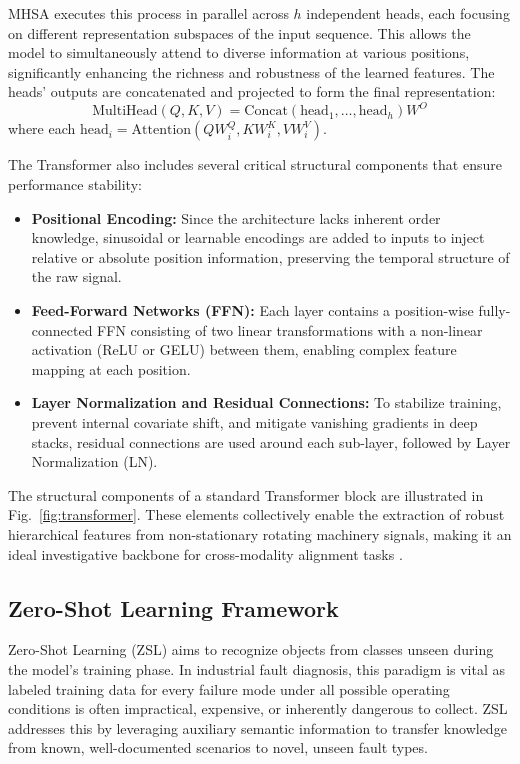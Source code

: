 \documentclass[journal]{IEEEtran}
\begin{document}
MHSA executes this process in parallel across $h$ independent heads, each focusing on different representation subspaces of the input sequence. This allows the model to simultaneously attend to diverse information at various positions, significantly enhancing the richness and robustness of the learned features. The heads' outputs are concatenated and projected to form the final representation:
\begin{equation}
\text{MultiHead}(Q, K, V) = \text{Concat}(\text{head}_1, \dots, \text{head}_h)W^O
\end{equation}
where each $\text{head}_i = \text{Attention}(QW_i^Q, KW_i^K, VW_i^V)$.

The Transformer also includes several critical structural components that ensure performance stability:
\begin{itemize}
    \item \textbf{Positional Encoding:} Since the architecture lacks inherent order knowledge, sinusoidal or learnable encodings are added to inputs to inject relative or absolute position information, preserving the temporal structure of the raw signal.
    \item \textbf{Feed-Forward Networks (FFN):} Each layer contains a position-wise fully-connected FFN consisting of two linear transformations with a non-linear activation (ReLU or GELU) between them, enabling complex feature mapping at each position.
    \item \textbf{Layer Normalization and Residual Connections:} To stabilize training, prevent internal covariate shift, and mitigate vanishing gradients in deep stacks, residual connections are used around each sub-layer, followed by Layer Normalization (LN).
\end{itemize}
The structural components of a standard Transformer block are illustrated in Fig.~\ref{fig:transformer}. These elements collectively enable the extraction of robust hierarchical features from non-stationary rotating machinery signals, making it an ideal investigative backbone for cross-modality alignment tasks \cite{vaswani2017attention}.

\subsection{Zero-Shot Learning Framework}
Zero-Shot Learning (ZSL) aims to recognize objects from classes unseen during the model's training phase. In industrial fault diagnosis, this paradigm is vital as labeled training data for every failure mode under all possible operating conditions is often impractical, expensive, or inherently dangerous to collect. ZSL addresses this by leveraging auxiliary semantic information to transfer knowledge from known, well-documented scenarios to novel, unseen fault types.
\end{document}
